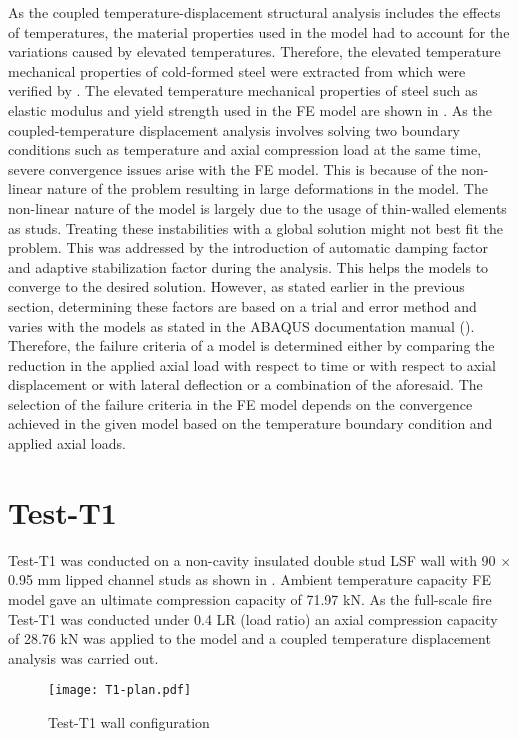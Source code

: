 As the coupled temperature-displacement structural analysis includes the effects of temperatures, the material properties used in the model had to account for the variations caused by elevated temperatures. Therefore, the elevated temperature mechanical properties of cold-formed steel were extracted from \citet{Kankanamge2011} which were verified by \citet{Rokilan2019}. The elevated temperature mechanical properties of steel such as elastic modulus and yield strength used in the FE model are shown in . As the coupled-temperature displacement analysis involves solving two boundary conditions such as temperature and axial compression load at the same time, severe convergence issues arise with the FE model. This is because of the non-linear nature of the problem resulting in large deformations in the model. The non-linear nature of the model is largely due to the usage of thin-walled elements as studs. Treating these instabilities with a global solution might not best fit the problem. This was addressed by the introduction of automatic damping factor and adaptive stabilization factor during the analysis. This helps the models to converge to the desired solution. However, as stated earlier in the previous section, determining these factors are based on a trial and error method and varies with the models as stated in the ABAQUS documentation manual (\cite{abaqus2017}). Therefore, the failure criteria of a model is determined either by comparing the reduction in the applied axial load with respect to time or with respect to axial displacement or with lateral deflection or a combination of the aforesaid. The selection of the failure criteria in the FE model depends on the convergence achieved in the given model based on the temperature boundary condition and applied axial loads. 

\section*{Test-T1}

Test-T1 was conducted on a non-cavity insulated double stud LSF wall with 90 $\times$ 0.95 mm lipped channel studs as shown in . Ambient temperature capacity FE model gave an ultimate compression capacity of 71.97 kN. As the full-scale fire Test-T1 was conducted under 0.4 LR (load ratio) an axial compression capacity of 28.76 kN was applied to the model and a coupled temperature displacement analysis was carried out. 
\begin{figure}[!htbp]
	\centering
			\texttt{[image: T1-plan.pdf]}\\
		\caption{Test-T1 wall configuration}
		\label{fig:T1-plan-FEA}
\end{figure}

